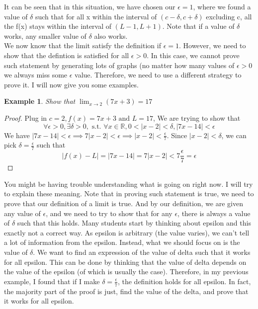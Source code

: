 \documentclass{book}
\newtheorem{example}[theorem]{Example}
\begin{document}
It can be seen that in this situation, we have chosen our $\epsilon = 1$, where we found a value of $\delta$ such that for all x within the interval of $(c - \delta, c + \delta)$ excluding c, all the f(x) stays within the interval of $(L - 1, L + 1)$. Note that if a value of $\delta$ works, any smaller value of $\delta$ also works. \\
We now know that the limit satisfy the definition if $\epsilon = 1$. However, we need to show that the defintion is satisfied for all $\epsilon > 0$. In this case, we cannot prove such statement by generating lots of graphs (no matter how many values of $\epsilon > 0$ we always miss some $\epsilon$ value. Therefore, we need to use a different strategy to prove it. I will now give you some examples.

\begin{example} \label{Example 2.1.2}
    Show that $\lim_{x \rightarrow 2} (7x + 3) = 17$
\end{example}

\begin{proof}
    Plug in $c = 2,f(x) = 7x + 3 \text{ and } L = 17$, We are trying to show that 
    $$\forall \epsilon > 0, \exists \delta > 0, \text{ s.t. } \forall x \in \mathbb{R}, 0 < |x - 2| < \delta, |7x - 14| < \epsilon$$
    We have $|7x - 14| < \epsilon \implies 7|x - 2| < \epsilon \implies |x - 2| < \frac{\epsilon}{7}$. Since $|x - 2| < \delta$, we can pick $\delta = \frac{\epsilon}{7}$ such that
    $$|f(x) - L| = |7x - 14| = 7|x - 2| < 7 \frac{\epsilon}{7} = \epsilon$$
\end{proof}

You might be having trouble understanding what is going on right now. I will try to explain these meaning. Note that in proving such statement is true, we need to prove that our definition of a limit is true. And by our definition, we are given any value of $\epsilon$, and we need to try to show that for any $\epsilon$, there is always a value of $\delta$ such that this holds. Many students start by thinking about epsilon and this exactly not a correct way. As epsilon is arbitrary (the value varies), we can't tell a lot of information from the epsilon. Instead, what we should focus on is the value of $\delta$. We want to find an expression of the value of delta such that it works for all epsilon. This can be done by thinking that the value of delta depends on the value of the epsilon (of which is usually the case). Therefore, in my previous example, I found that if I make $\delta = \frac{\epsilon}{7}$, the definition holds for all epsilon. In fact, the majority part of the proof is just, find the value of the delta, and prove that it works for all epsilon. \\
\end{document}
